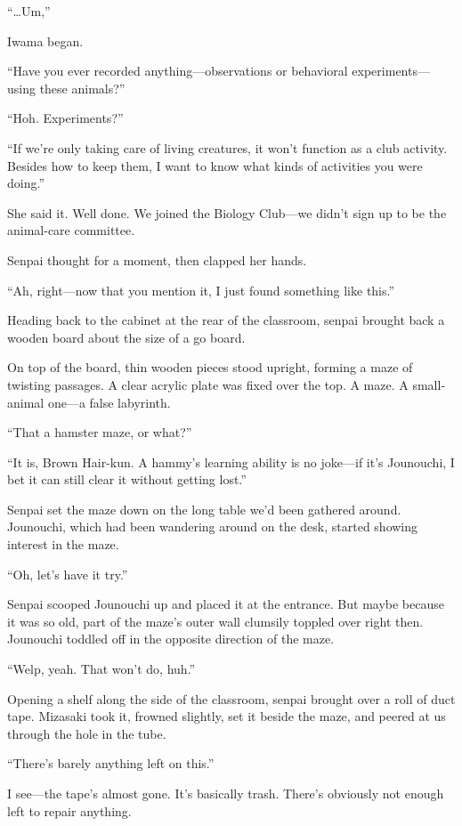 \documentclass[
    a4paper,
    12pt,
    twoside,
    openany,
    UTF8,
    fontset=windows
]{ctexbook}
\begin{document}
``\dots Um,''

Iwama began.

``Have you ever recorded anything---observations or behavioral experiments---using these animals?''

``Hoh. Experiments?''

``If we're only taking care of living creatures, it won't function as a club activity. Besides how to keep them, I want to know what kinds of activities you were doing.''

She said it. Well done. We joined the Biology Club---we didn't sign up to be the animal-care committee.

Senpai thought for a moment, then clapped her hands.

``Ah, right---now that you mention it, I just found something like this.''

Heading back to the cabinet at the rear of the classroom, senpai brought back a wooden board about the size of a go board.

On top of the board, thin wooden pieces stood upright, forming a maze of twisting passages. A clear acrylic plate was fixed over the top. A maze. A small-animal one---a false labyrinth.

``That a hamster maze, or what?''

``It is, Brown Hair-kun. A hammy's learning ability is no joke---if it's Jounouchi, I bet it can still clear it without getting lost.''

Senpai set the maze down on the long table we'd been gathered around. Jounouchi, which had been wandering around on the desk, started showing interest in the maze.

``Oh, let's have it try.''

Senpai scooped Jounouchi up and placed it at the entrance. But maybe because it was so old, part of the maze's outer wall clumsily toppled over right then. Jounouchi toddled off in the opposite direction of the maze.

``Welp, yeah. That won't do, huh.''

Opening a shelf along the side of the classroom, senpai brought over a roll of duct tape. Mizasaki took it, frowned slightly, set it beside the maze, and peered at us through the hole in the tube.

``There's barely anything left on this.''

I see---the tape's almost gone. It's basically trash. There's obviously not enough left to repair anything.
\end{document}

